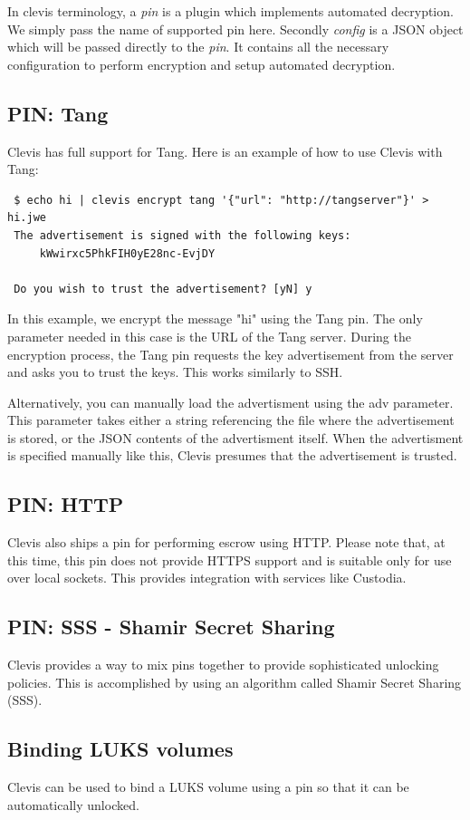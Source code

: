 \documentclass[../xdudla00-porting-Tang-to-Open-WRT.tex]{subfiles}
\begin{document}
In clevis terminology, a {\it pin} is a plugin which implements automated decryption.
We simply pass the name of supported pin here.
Secondly {\it config} is a JSON object which will be passed directly to the {\it pin}.
It contains all the necessary configuration to perform encryption and setup automated decryption.

\subsection{PIN: Tang}
Clevis has full support for Tang. Here is an example of how to use Clevis with Tang:
{\tt \begin{verbatim} $ echo hi | clevis encrypt tang '{"url": "http://tangserver"}' > hi.jwe
 The advertisement is signed with the following keys:
     kWwirxc5PhkFIH0yE28nc-EvjDY

 Do you wish to trust the advertisement? [yN] y\end{verbatim}
}
In this example, we encrypt the message "hi" using the Tang pin.
The only parameter needed in this case is the URL of the Tang server.
During the encryption process, the Tang pin requests the key advertisement from the server and asks you to trust the keys.
This works similarly to SSH.

Alternatively, you can manually load the advertisment using the adv parameter.
This parameter takes either a string referencing the file where the advertisement is stored, or the JSON contents of the advertisment itself.
When the advertisment is specified manually like this, Clevis presumes that the advertisement is trusted.
\subsection{PIN: HTTP}
Clevis also ships a pin for performing escrow using HTTP.
Please note that, at this time, this pin does not provide HTTPS support and is suitable only for use over local sockets.
This provides integration with services like Custodia.

\subsection{PIN: SSS - Shamir Secret Sharing}
Clevis provides a way to mix pins together to provide sophisticated unlocking policies.
This is accomplished by using an algorithm called Shamir Secret Sharing (SSS).

\subsection{Binding LUKS volumes}
Clevis can be used to bind a LUKS volume using a pin so that it can be automatically unlocked.
\end{document}
